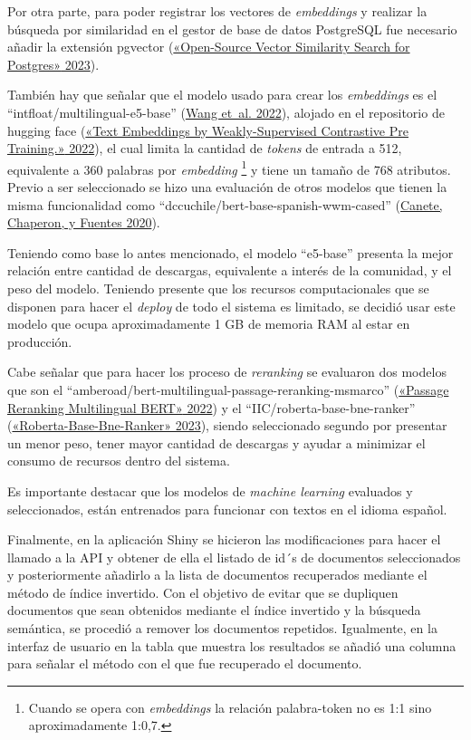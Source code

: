 \documentclass[
  12pt,
  openany]{book}
\begin{document}
Por otra parte, para poder registrar los vectores de \emph{embeddings} y realizar la búsqueda por similaridad en el gestor de base de datos PostgreSQL fue necesario añadir la extensión pgvector (\protect\hyperlink{ref-pgvector2023}{{«Open-Source Vector Similarity Search for Postgres»} 2023}).

También hay que señalar que el modelo usado para crear los \emph{embeddings} es el ``intfloat/multilingual-e5-base'' (\protect\hyperlink{ref-wang2022}{Wang et~al. 2022}), alojado en el repositorio de hugging face (\protect\hyperlink{ref-e5base}{{«Text Embeddings by Weakly-Supervised Contrastive Pre Training.»} 2022}), el cual limita la cantidad de \emph{tokens} de entrada a 512, equivalente a 360 palabras por \emph{embedding} \footnote{Cuando se opera con \emph{embeddings} la relación palabra-token no es 1:1 sino aproximadamente 1:0,7.} y tiene un tamaño de 768 atributos. Previo a ser seleccionado se hizo una evaluación de otros modelos que tienen la misma funcionalidad como ``dccuchile/bert-base-spanish-wwm-cased'' (\protect\hyperlink{ref-canete2020}{Canete, Chaperon, y Fuentes 2020}).

Teniendo como base lo antes mencionado, el modelo ``e5-base'' presenta la mejor relación entre cantidad de descargas, equivalente a interés de la comunidad, y el peso del modelo. Teniendo presente que los recursos computacionales que se disponen para hacer el \emph{deploy} de todo el sistema es limitado, se decidió usar este modelo que ocupa aproximadamente 1 GB de memoria RAM al estar en producción.

Cabe señalar que para hacer los proceso de \emph{reranking} se evaluaron dos modelos que son el ``amberoad/bert-multilingual-passage-reranking-msmarco'' (\protect\hyperlink{ref-erankingmsmarco}{{«Passage Reranking Multilingual BERT»} 2022}) y el ``IIC/roberta-base-bne-ranker'' (\protect\hyperlink{ref-hfranker2023}{{«Roberta-Base-Bne-Ranker»} 2023}), siendo seleccionado segundo por presentar un menor peso, tener mayor cantidad de descargas y ayudar a minimizar el consumo de recursos dentro del sistema.

Es importante destacar que los modelos de \emph{machine learning} evaluados y seleccionados, están entrenados para funcionar con textos en el idioma español.

Finalmente, en la aplicación Shiny se hicieron las modificaciones para hacer el llamado a la API y obtener de ella el listado de id´s de documentos seleccionados y posteriormente añadirlo a la lista de documentos recuperados mediante el método de índice invertido. Con el objetivo de evitar que se dupliquen documentos que sean obtenidos mediante el índice invertido y la búsqueda semántica, se procedió a remover los documentos repetidos. Igualmente, en la interfaz de usuario en la tabla que muestra los resultados se añadió una columna para señalar el método con el que fue recuperado el documento.
\end{document}
